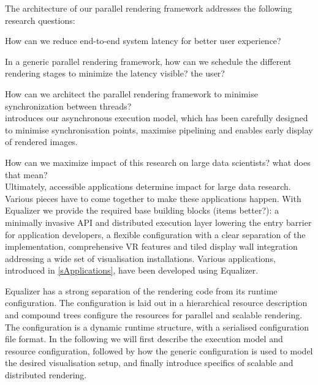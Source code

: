 The architecture of our parallel rendering framework addresses the following research questions:
\begin{compactitem}
  \item How can we reduce end-to-end system latency for better user experience?
  \item In a generic parallel rendering framework, how can we schedule the different rendering stages to minimize the latency visible? the user?
  \item How can we architect the parallel rendering framework to minimise synchronization between threads?\\[\medskipamount]
   introduces our asynchronous execution model, which has been carefully designed to minimise synchronisation points, maximise pipelining and enables early display of rendered images.\\[\medskipamount]

\item How can we maximize impact of this research on large data
scientists? what does that mean? \\[\medskipamount]

Ultimately, accessible applications determine impact for large data
research. Various pieces have to come together to make these applications
happen. With Equalizer we provide the required base building blocks (items better?): a minimally
invasive API and distributed execution layer lowering the entry barrier for
application developers, a flexible configuration with a clear separation of
the implementation, comprehensive VR features and tiled display wall
integration addressing a wide set of visualisation installations. Various
applications, introduced in \cref{sApplications}, have been developed using
Equalizer.\\[\medskipamount]

\end{compactitem}

Equalizer has a strong separation of the rendering code from its runtime
configuration. The configuration is laid out in a hierarchical resource
description and compound trees configure the resources for parallel and
scalable rendering. The configuration is a dynamic runtime structure, with a
serialised configuration file format. In the following we will first describe
the execution model and resource configuration, followed by how the generic
configuration is used to model the desired visualisation setup, and finally
introduce specifics of scalable and distributed rendering.

